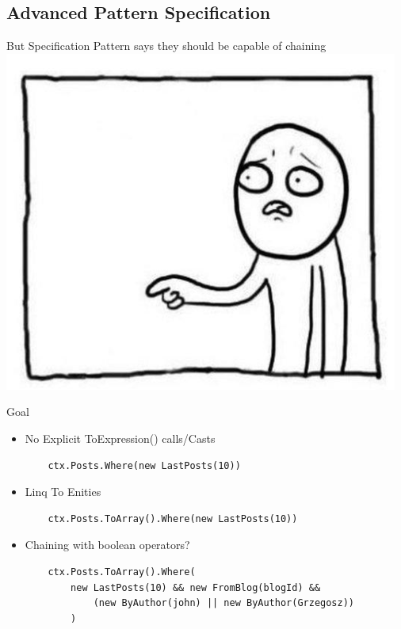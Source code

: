 \documentclass{bredelebeamer}
\begin{document}
\subsection{Advanced Pattern Specification}
\begin{frame}{But Specification Pattern says they should be capable of chaining}
    \includegraphics[scale=0.8]{images/But.png}
\end{frame}
\begin{frame}[fragile]{Goal}
    \begin{itemize}[<+->]
        \item {
            No Explicit ToExpression() calls/Casts
            \begin{lstlisting}
    ctx.Posts.Where(new LastPosts(10))
            \end{lstlisting}
        }
        \item {
            Linq To Enities
            \begin{lstlisting}
    ctx.Posts.ToArray().Where(new LastPosts(10))
            \end{lstlisting}
        }
        \item {
            Chaining with boolean operators?
            \begin{lstlisting}
    ctx.Posts.ToArray().Where(
        new LastPosts(10) && new FromBlog(blogId) &&
            (new ByAuthor(john) || new ByAuthor(Grzegosz))
        )
            \end{lstlisting}
        }
    \end{itemize}

\end{frame}
\end{document}
